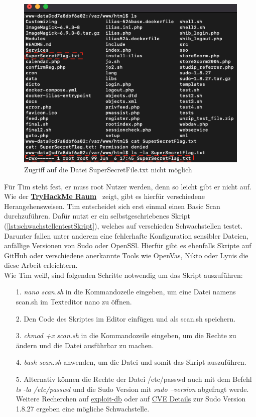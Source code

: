 \documentclass[10pt, a4paper,onecolumn ,titlepage]{article}
\begin{document}
    \begin{figure}[H]
        \centering
        \includegraphics[width=1\textwidth]{storyline_bilder_vm2/FileDenied}
        \caption{Zugriff auf die Datei SuperSecretFile.txt nicht möglich}
        \label{fig:fileDenied}
    \end{figure}
    \noindent
    Für Tim steht fest, er muss root Nutzer werden, denn so leicht gibt er nicht auf.
    Wie der \href{https://tryhackme.com/jr/t1mth3h4ck3rb0y}{\textbf{TryHackMe Raum}}~\parencite{privilegeEscalationRaumTryHackMe} zeigt, gibt es hierfür verschiedene Herangehensweisen.
    Tim entscheidet sich erst einmal einen Basic Scan durchzuführen.
    Dafür nutzt er ein selbstgeschriebenes Skript (\ref{lst:schwachstellentestSkript}), welches auf verschieden Schwachstellen testet.
    Darunter fallen unter anderem eine fehlerhafte Konfiguration sensibler Dateien, anfällige Versionen von Sudo oder OpenSSl.
    Hierfür gibt es ebenfalls Skripte auf GitHub oder verschiedene anerkannte Tools wie OpenVas, Nikto oder Lynis die diese Arbeit erleichtern.
    \\
    Wie Tim weiß, sind folgenden Schritte notwendig um das Skript auszuführen:
    \begin{enumerate}[leftmargin=2.5cm]
        \item[1.] \textit{nano scan.sh}  in die Kommandozeile eingeben, um eine Datei namens scan.sh im Texteditor nano zu öffnen.
        \item[2.] Den Code des Skriptes im Editor einfügen und als scan.sh speichern.
        \item[3.] \textit{chmod +x scan.sh}  in die Kommandozeile eingeben, um die Rechte zu ändern und die Datei ausführbar zu machen.
        \item[4.] \textit{bash scan.sh}  anwenden, um die Datei und somit das Skript auszuführen.
        \item[5.] Alternativ können die Rechte der Datei /etc/passwd auch mit dem Befehl \textit{ls -la /etc/passwd} und die Sudo Version mit \textit{sudo --version} abgefragt werde.
        Weitere Recherchen auf \href{https://www.exploit-db.com/exploits/47502}{exploit-db} oder auf \href{https://www.cvedetails.com/cve/CVE-2019-14287/}{CVE Details} zur Sudo Version 1.8.27 ergeben eine mögliche Schwachstelle.
    \end{enumerate}
\end{document}
